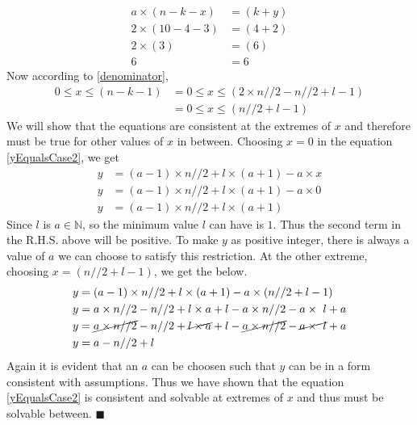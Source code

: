 \documentclass[12pt, twoside]{article}
\begin{document}
\begin{align}
	a \times (n-k-x) &= (k+y) \nonumber \\
	2 \times (10-4-3) &= (4+2) \nonumber \\
	2 \times (3) &= (6) \nonumber \\
	6 &= 6 \nonumber
\end{align}
Now according to \eqref{denominator}, 
\begin{align}
	0 \leq x \leq (n-k-1) &= 0 \leq x \leq (2\times n//2-n//2+l-1) \nonumber \\
	&= 0 \leq x \leq (n//2+l-1) \label{LimitOfXforYEqualsCase2}
\end{align}
We will show that the equations are consistent at the extremes of $x$ and therefore must be true for other values of $x$ in between.\newline
Choosing $x=0$ in the equation \eqref{yEqualsCase2}, we get
\begin{align*}
	y &= (a-1)\times n//2 + l \times (a+1) - a\times x \\
	y &= (a-1)\times n//2 + l \times (a+1) - a\times 0 \\
	y &= (a-1)\times n//2 + l \times (a+1)
\end{align*}
Since $l$ is $a \in \mathbb{N}$, so the minimum value $l$ can have is $1$. Thus the second term in the R.H.S. above will be positive. To make $y$ as positive integer, there is always a value of $a$ we can choose to satisfy this restriction.\newline
At the other extreme, choosing $x=(n//2+l-1)$, we get the below.
\begin{align*}
	y &= (a-1)\times n//2 + l \times (a+1) - a\times (n//2+l-1) \\
	y &= a\times n//2 - n//2 +l\times a +l -a\times n//2-a\times\ l + a \\
	y &= \cancel{a\times n//2} - n//2 +\cancel{l\times a} +l -\cancel{a\times n//2}-\cancel{a\times\ l} + a \\
	y &= a - n//2 + l 
\end{align*}
Again it is evident that an $a$ can be choosen such that $y$ can be in a form consistent with assumptions. Thus we have shown that the equation \eqref{yEqualsCase2} is consistent and solvable at extremes of $x$ and thus must be solvable between. $\blacksquare$
\end{document}
